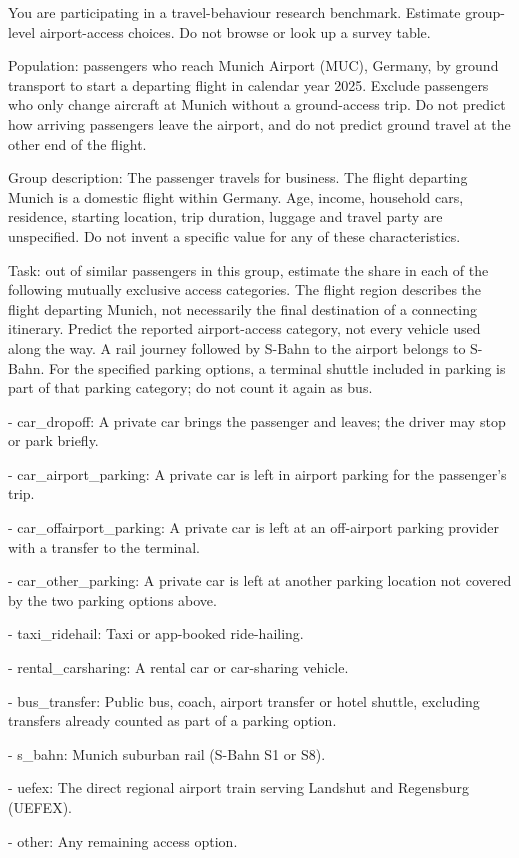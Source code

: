 \begin{promptbox}[title={Munich business / domestic group: full request}]
You are participating in a travel-behaviour research benchmark. Estimate group-level airport-access choices. Do not browse or look up a survey table.

Population: passengers who reach Munich Airport (MUC), Germany, by ground transport to start a departing flight in calendar year 2025. Exclude passengers who only change aircraft at Munich without a ground-access trip. Do not predict how arriving passengers leave the airport, and do not predict ground travel at the other end of the flight.

Group description: The passenger travels for business. The flight departing Munich is a domestic flight within Germany. Age, income, household cars, residence, starting location, trip duration, luggage and travel party are unspecified. Do not invent a specific value for any of these characteristics.

Task: out of similar passengers in this group, estimate the share in each of the following mutually exclusive access categories. The flight region describes the flight departing Munich, not necessarily the final destination of a connecting itinerary. Predict the reported airport-access category, not every vehicle used along the way. A rail journey followed by S-Bahn to the airport belongs to S-Bahn. For the specified parking options, a terminal shuttle included in parking is part of that parking category; do not count it again as bus.\par 
- car\_dropoff: A private car brings the passenger and leaves; the driver may stop or park briefly.\par 
- car\_airport\_parking: A private car is left in airport parking for the passenger's trip.\par 
- car\_offairport\_parking: A private car is left at an off-airport parking provider with a transfer to the terminal.\par 
- car\_other\_parking: A private car is left at another parking location not covered by the two parking options above.\par 
- taxi\_ridehail: Taxi or app-booked ride-hailing.\par 
- rental\_carsharing: A rental car or car-sharing vehicle.\par 
- bus\_transfer: Public bus, coach, airport transfer or hotel shuttle, excluding transfers already counted as part of a parking option.\par 
- s\_bahn: Munich suburban rail (S-Bahn S1 or S8).\par 
- uefex: The direct regional airport train serving Landshut and Regensburg (UEFEX).\par 
- other: Any remaining access option.


\end{promptbox}
